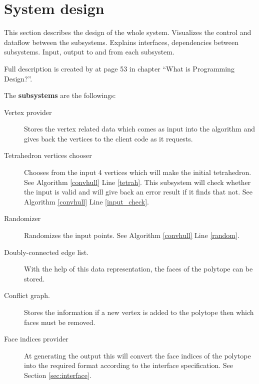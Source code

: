 

\section{System design}

This section describes the design of the whole system. Visualizes the control
and dataflow between the subsystems. Explains interfaces, dependencies between
subsystems. Input, output to and from each subsystem.

Full description is created by \citeauthor{profcpp11} at page 53 in chapter
``What is Programming Design?''.

The \textbf{subsystems} are the followings:

\begin{description}
	\item	[Vertex provider] Stores the vertex related data which comes as
		input into the algorithm and gives back the vertices to the client code
		as it requests.

	\item	[Tetrahedron vertices chooser]	Chooses from the input 4 vertices
		which will make the initial tetrahedron. See Algorithm \ref{convhull}
		Line \ref{tetrah}.
		This subsystem will check whether the input is valid and will give back
		an error result if it finds that not. See Algorithm \ref{convhull} Line
		\ref{input_check}.

	\item	[Randomizer] Randomizes the input points. See Algorithm
				\ref{convhull} Line \ref{random}.

	\item	[Doubly-connected edge list.] With the help of this data
				representation, the faces of the polytope can be stored.

	\item	[Conflict graph.] Stores the information if a new vertex is added to
				the polytope then which faces must be removed.
				
	\item	[Face indices provider] At generating the output this will convert
		the face indices of the polytope into the required format according
		to the interface specification. See Section \ref{sec:interface}.

\end{description}
